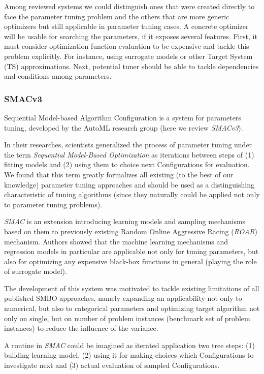 Among reviewed systems we could distinguish ones that were created directly to face the parameter tuning problem and the others that are more generic optimizers but still applicable in parameter tuning cases.
A concrete optimizer will be usable for searching the parameters, if it exposes several features. First, it must consider optimization function evaluation to be expensive and tackle this problem explicitly. For instance, using surrogate models or other Target System (TS) approximations. Next, potential tuner should be able to tackle dependencies and conditions among parameters.

\subsubsection{SMACv3~\cite{hutter2011sequential}}\label{bg: smac}
Sequential Model-based Algorithm Configuration is a system for parameters tuning, developed by the AutoML research group (here we review \textit{SMACv3}). 

In their researches, scientists generalized the process of parameter tuning under the term \textit{Sequential Model-Based Optimization} as iterations between steps of (1) fitting models and (2) using them to choice next Configurations for evaluation. 
We found that this term greatly formalizes all existing (to the best of our knowledge) parameter tuning approaches and should be used as a distinguishing characteristic of tuning algorithms (since they naturally could be applied not only to parameter tuning problems).

\textit{SMAC} is an extension introducing learning models and sampling mechanisms based on them to previously existing Random Online Aggressive Racing (\textit{ROAR}) mechanism. Authors showed that the machine learning mechanisms and regression models in particular are applicable not only for tuning parameters, but also for optimizing any expensive black-box functions in general (playing the role of surrogate model). 

The development of this system was motivated to tackle existing limitations of all published SMBO approaches, namely expanding an applicability not only to numerical, but also to categorical parameters and optimizing target algorithm not only on single, but on number of problem instances (benchmark set of problem instances) to reduce the influence of the variance.

A routine in \textit{SMAC} could be imagined as iterated application two tree steps: (1) building learning model, (2) using it for making choices which Configurations to investigate next and (3) actual evaluation of sampled Configurations.

